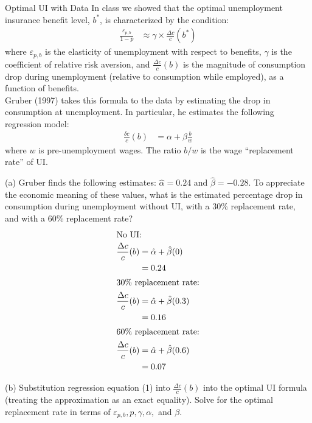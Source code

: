 \documentclass[8pt]{extarticle}
\begin{document}
  \begin{problem}{Optimal UI with Data}
    In class we showed that the optimal unemployment insurance benefit level, $b^*$, is characterized by the condition:
    \begin{align*}
      \frac{\varepsilon_{p,b}}{1-p} &\approx \gamma \times \frac{\Delta c}{c}(b^*)
    \end{align*}
    where $\varepsilon_{p,b}$ is the elasticity of unemployment with respect to benefits, $\gamma$ is the coefficient of relative risk aversion, and $\frac{\Delta c}{c}(b)$ is the magnitude of consumption drop during unemployment (relative to consumption while employed), as a function of benefits.\\

    Gruber (1997) takes this formula to the data by estimating the drop in consumption at unemployment. In particular, he estimates the following regression model:
    \begin{align*}
      \frac{\delta c}{c}(b) &= \alpha + \beta \frac{b}{w}
    \end{align*}
    where $w$ is pre-unemployment wages. The ratio $b/w$ is the wage ``replacement rate'' of UI.
    \tcblower
    \begin{problem}{(a)}
      Gruber finds the following estimates: $\hat{\alpha} = 0.24$ and $\hat{\beta} = -0.28$. To appreciate the economic meaning of these values, what is the estimated percentage drop in consumption during unemployment without UI, with a 30\% replacement rate, and with a 60\% replacement rate?
      \tcblower
      \begin{align*}
        \shortintertext{No UI:}
        \frac{\Delta c}{c}(b) &= \hat\alpha + \hat\beta(0)\\
                              &= 0.24\\
        \shortintertext{30\% replacement rate:}
        \frac{\Delta c}{c}(b) &= \hat \alpha + \hat\beta(0.3)\\
                              &= 0.16\\
        \shortintertext{60\% replacement rate:}
        \frac{\Delta c}{c}(b) &= \hat \alpha + \hat\beta(0.6)\\
                              &= 0.07
      \end{align*}
    \end{problem}
    \begin{problem}{(b)}
      Substitution regression equation (1) into $\frac{\Delta c}{c}(b)$ into the optimal UI formula (treating the approximation as an exact equality). Solve for the optimal replacement rate  in terms of $\varepsilon_{p,b},p,\gamma,\alpha,$ and $\beta$.

\end{problem}
\end{problem}
\end{document}
